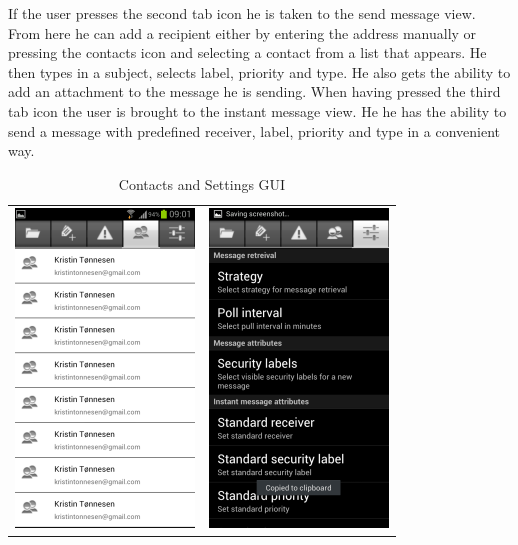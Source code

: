 If the user presses the second tab icon he is taken to the send message view. From here he can add a recipient either by entering the address manually or pressing the contacts icon and selecting a contact from a list that appears. He then types in a subject, selects label, priority and type. He also gets the ability to add an attachment to the message he is sending. 
\newline
\newline
When having pressed the third tab icon the user is brought to the instant message view. He he has the ability to send a message with predefined receiver, label, priority and type in a convenient way.
\newline
\begin{table}[h!]
\begin{center}
\begin{tabular}{cc}
\includegraphics{contacts} & \includegraphics{settingsgui}
\end{tabular}
\end{center}
\caption{Contacts and Settings GUI} \label{tab:contactssetingsgui}
\end{table}

